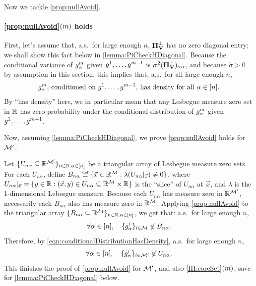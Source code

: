 \documentclass[main.tex]{subfiles}
\begin{document}
Now we tackle \ref{prop:nullAvoid}.

\paragraph{\ref{prop:nullAvoid}$(m)$ holds}

First, let's assume that, a.s.\ for large enough $n$, $\boldsymbol{\Pi}_{\mathbf{V}}^\perp$ has no zero diagonal entry;
we shall show this fact below in \cref{lemma:PiCheckHDiagonal}.
Because the conditional variance of $g^m_\alpha$ given $g^1, \ldots, g^{m-1}$ is $\sigma^2 (\boldsymbol{\Pi}_{\mathbf{V}}^\perp)_{\alpha\alpha}$, and because $\mathring \sigma > 0$ by assumption in this section, this implies that, a.s.\ for all large enough $n$,
\begin{equation}
\text{$g^\MM_\alpha$, conditioned on $g^1, \ldots, g^{\MM-1}$, has density for all $\alpha \in [n]$.}
\label{eqn:conditionalDistributionHasDensity}
\end{equation}
By ``has density'' here, we in particular mean that any Lesbegue measure zero set in $\mathbb{R}$ has zero probability under the conditional distribution of $g^m_\alpha$ given $g^1, \ldots, g^{m-1}$.

Now, assuming \cref{lemma:PiCheckHDiagonal}, we prove \ref{prop:nullAvoid} holds for $\mathcal{M}'$.

Let $\{U_{n\alpha} \subseteq \mathbb{R}^{\mathcal{M}'}\}_{n\in\mathbb{N}, \alpha \in [n]}$ be a triangular array of Lesbegue measure zero sets.
For each $U_{n\alpha}$, define $B_{n\alpha} \defeq \{\vec x \in \R^{\coreset}: \lambda(U_{n\alpha}|_{\vec x}) \ne 0\}$, where $U_{n\alpha}|_{\vec x} = \{y \in \mathbb{R}: (\vec x, y) \in U_{n\alpha} \subseteq \mathbb{R}^{\mathcal{M}} \times \mathbb{R}\}$ is the ``slice'' of $U_{n\alpha}$ at $\vec x$, and $\lambda$ is the 1-dimensional Lebesgue measure.
Because each $U_{n\alpha}$ has measure zero in $\mathbb{R}^{\mathcal{M}'}$, necessarily each $B_{n\alpha}$ also has measure zero in $\mathbb{R}^{\mathcal{M}}$.
Applying \ref{prop:nullAvoid} to the triangular array $\{B_{n\alpha} \subseteq \mathbb{R}^{\mathcal{M}}\}_{n \in \mathbb{N}, \alpha \in [n]}$, we get that: a.s.\ for large enough $n$,
\[
\forall \alpha \in [n],\quad \{g^i_\alpha\}_{i \in \mathcal{M}} \not \in B_{n\alpha}.\]
Therefore, by \cref{eqn:conditionalDistributionHasDensity}, a.s.\ for large enough $n$,
\[
\forall \alpha \in [n],\quad \{g^i_\alpha\}_{i \in \mathcal{M}'} \not \in U_{n\alpha}.
\]
This finishes the proof of \ref{prop:nullAvoid} for $\mathcal{M}'$, and also \ref{IH:coreSet}$(m)$, save for \cref{lemma:PiCheckHDiagonal} below.
\end{document}
